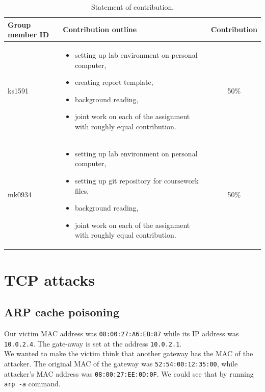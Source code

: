 \documentclass[12pt, a4paper, pdflatex]{article}
\begin{document}
\begin{center}
  \begin{table}[h]
    \begin{tabular}{ l | p{8.5cm} | c }
      Group member ID & Contribution outline & Contribution \\
      \hline
      ks1591 &
      \begin{itemize}
        \item setting up lab environment on personal computer,
        \item creating report template,
        \item background reading,
        \item joint work on each of the assignment with roughly equal contribution.
      \end{itemize}
      & 50\% \\
      mk0934 &
      \begin{itemize}
        \item setting up lab environment on personal computer,
        \item setting up git repository for coursework files,
        \item background reading,
        \item joint work on each of the assignment with roughly equal contribution.
      \end{itemize}
      & 50\% \\
    \end{tabular}
    \caption{Statement of contribution.\label{tab:SoC}}
  \end{table}
\end{center}

\newpage

\section{TCP attacks}

\subsection{ARP cache poisoning}\label{arp}

Our victim MAC address was \texttt{08:00:27:A6:EB:87} while its IP address was \texttt{10.0.2.4}. The gate-away is set at the address \texttt{10.0.2.1}.\\

We wanted to make the victim think that another gateway has the MAC of the attacker. The original MAC of the gateway was \texttt{52:54:00:12:35:00}, while attacker's MAC address was \texttt{08:00:27:EE:0D:0F}. We could see that by running \texttt{arp -a} command.\\
\end{document}
